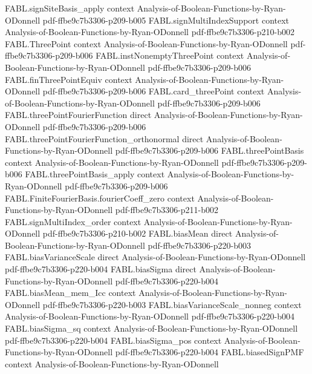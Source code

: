 \begin{theorem}
\proofstep
  {FABL.signSiteBasis_apply}
  {context}
  {Analysis-of-Boolean-Functions-by-Ryan-ODonnell}
  {pdf-ffbe9c7b3306-p209-b005}
\proofstep
  {FABL.signMultiIndexSupport}
  {context}
  {Analysis-of-Boolean-Functions-by-Ryan-ODonnell}
  {pdf-ffbe9c7b3306-p210-b002}
\proofstep
  {FABL.ThreePoint}
  {context}
  {Analysis-of-Boolean-Functions-by-Ryan-ODonnell}
  {pdf-ffbe9c7b3306-p209-b006}
\proofstep
  {FABL.instNonemptyThreePoint}
  {context}
  {Analysis-of-Boolean-Functions-by-Ryan-ODonnell}
  {pdf-ffbe9c7b3306-p209-b006}
\proofstep
  {FABL.finThreePointEquiv}
  {context}
  {Analysis-of-Boolean-Functions-by-Ryan-ODonnell}
  {pdf-ffbe9c7b3306-p209-b006}
\proofstep
  {FABL.card_threePoint}
  {context}
  {Analysis-of-Boolean-Functions-by-Ryan-ODonnell}
  {pdf-ffbe9c7b3306-p209-b006}
\proofstep
  {FABL.threePointFourierFunction}
  {direct}
  {Analysis-of-Boolean-Functions-by-Ryan-ODonnell}
  {pdf-ffbe9c7b3306-p209-b006}
\proofstep
  {FABL.threePointFourierFunction_orthonormal}
  {direct}
  {Analysis-of-Boolean-Functions-by-Ryan-ODonnell}
  {pdf-ffbe9c7b3306-p209-b006}
\proofstep
  {FABL.threePointBasis}
  {context}
  {Analysis-of-Boolean-Functions-by-Ryan-ODonnell}
  {pdf-ffbe9c7b3306-p209-b006}
\proofstep
  {FABL.threePointBasis_apply}
  {context}
  {Analysis-of-Boolean-Functions-by-Ryan-ODonnell}
  {pdf-ffbe9c7b3306-p209-b006}
\proofstep
  {FABL.FiniteFourierBasis.fourierCoeff_zero}
  {context}
  {Analysis-of-Boolean-Functions-by-Ryan-ODonnell}
  {pdf-ffbe9c7b3306-p211-b002}
\proofstep
  {FABL.signMultiIndex_order}
  {context}
  {Analysis-of-Boolean-Functions-by-Ryan-ODonnell}
  {pdf-ffbe9c7b3306-p210-b002}
\proofstep
  {FABL.biasMean}
  {direct}
  {Analysis-of-Boolean-Functions-by-Ryan-ODonnell}
  {pdf-ffbe9c7b3306-p220-b003}
\proofstep
  {FABL.biasVarianceScale}
  {direct}
  {Analysis-of-Boolean-Functions-by-Ryan-ODonnell}
  {pdf-ffbe9c7b3306-p220-b004}
\proofstep
  {FABL.biasSigma}
  {direct}
  {Analysis-of-Boolean-Functions-by-Ryan-ODonnell}
  {pdf-ffbe9c7b3306-p220-b004}
\proofstep
  {FABL.biasMean_mem_Icc}
  {context}
  {Analysis-of-Boolean-Functions-by-Ryan-ODonnell}
  {pdf-ffbe9c7b3306-p220-b003}
\proofstep
  {FABL.biasVarianceScale_nonneg}
  {context}
  {Analysis-of-Boolean-Functions-by-Ryan-ODonnell}
  {pdf-ffbe9c7b3306-p220-b004}
\proofstep
  {FABL.biasSigma_sq}
  {context}
  {Analysis-of-Boolean-Functions-by-Ryan-ODonnell}
  {pdf-ffbe9c7b3306-p220-b004}
\proofstep
  {FABL.biasSigma_pos}
  {context}
  {Analysis-of-Boolean-Functions-by-Ryan-ODonnell}
  {pdf-ffbe9c7b3306-p220-b004}
\proofstep
  {FABL.biasedSignPMF}
  {context}
  {Analysis-of-Boolean-Functions-by-Ryan-ODonnell}

\end{theorem}
